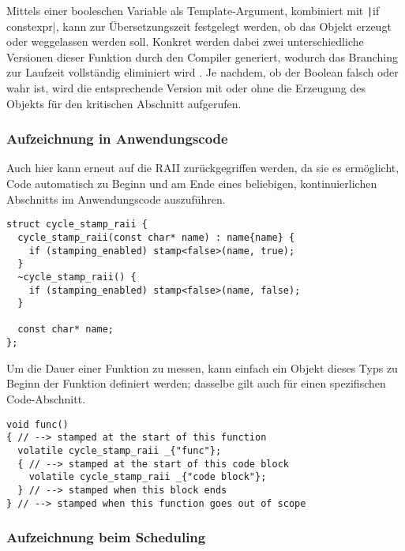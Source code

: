 Mittels einer booleschen Variable als Template-Argument, kombiniert mit
\texttt|if constexpr|, kann zur Übersetzungszeit festgelegt werden, ob
das Objekt erzeugt oder weggelassen werden soll. Konkret werden dabei zwei
unterschiedliche Versionen dieser Funktion durch den Compiler generiert, wodurch
das Branching zur Laufzeit vollständig eliminiert wird
\cite{cppreference_constexpr_if}. Je nachdem, ob der Boolean falsch oder wahr
ist, wird die entsprechende Version mit oder ohne die Erzeugung des Objekts für
den kritischen Abschnitt aufgerufen.

\subsubsection{Aufzeichnung in Anwendungscode}

Auch hier kann erneut auf die RAII zurückgegriffen werden, da sie es ermöglicht,
Code automatisch zu Beginn und am Ende eines beliebigen, kontinuierlichen
Abschnitts im Anwendungscode auszuführen.

\begin{code}
\begin{verbatim}
struct cycle_stamp_raii {
  cycle_stamp_raii(const char* name) : name{name} {
    if (stamping_enabled) stamp<false>(name, true);
  }
  ~cycle_stamp_raii() {
    if (stamping_enabled) stamp<false>(name, false);
  }

  const char* name;
};
\end{verbatim}
\end{code}

Um die Dauer einer Funktion zu messen, kann einfach ein Objekt dieses Typs zu
Beginn der Funktion definiert werden; dasselbe gilt auch für einen spezifischen
Code-Abschnitt.

\begin{code}
\begin{verbatim}
void func()
{ // --> stamped at the start of this function
  volatile cycle_stamp_raii _{"func"};
  { // --> stamped at the start of this code block
    volatile cycle_stamp_raii _{"code block"};
  } // --> stamped when this block ends
} // --> stamped when this function goes out of scope
\end{verbatim}
\end{code}

\subsubsection{Aufzeichnung beim Scheduling}

